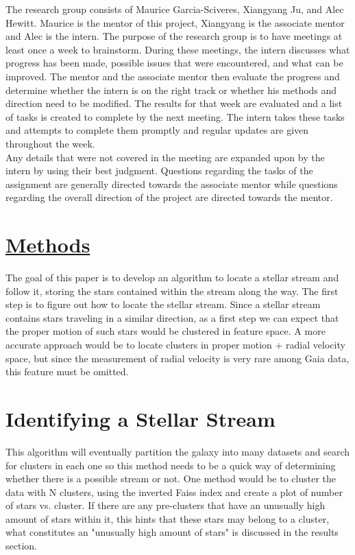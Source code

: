 \documentclass[notitlepage,nofootinbib,preprintnumbers,aps,prd]{revtex4-1}
\begin{document}
\indent The research group consists of Maurice Garcia-Sciveres, Xiangyang Ju, and Alec Hewitt.
Maurice is the mentor of this project, Xiangyang is the associate mentor and Alec is the intern.
The purpose of the research group is to have meetings at least once a week to brainstorm. During
these meetings, the intern discusses what progress has been made, possible issues that were encountered, and what can be improved. The mentor and the associate mentor then evaluate the
progress and determine whether the intern is on the right track or whether his methods and direction need to be modified. The results for that week are evaluated and a list of tasks is created to
complete by the next meeting. The intern takes these tasks and attempts to complete them
promptly and regular updates are given throughout the week.\\

\indent Any details that were not covered in the meeting are expanded upon by the intern by using their best judgment. Questions regarding the tasks of the assignment are generally directed
towards the associate mentor while questions regarding the overall direction of the project are
directed towards the mentor.\\


\section{\underline{Methods}}
\indent The goal of this paper is to develop an algorithm to locate a stellar stream and follow it, storing the stars contained within the stream along the way. The first step is to figure out how to locate the stellar stream. Since a stellar stream contains stars traveling in a similar direction, as a first step we can expect that the proper motion of such stars would be clustered in feature space. A more accurate approach would be to locate clusters in proper motion + radial velocity space, but since the measurement of radial velocity is very rare among Gaia data, this feature must be omitted. \\
\section*{Identifying a Stellar Stream}
\indent This algorithm will eventually partition the galaxy into many datasets and search for clusters in each one so this method needs to be a quick way of determining whether there is a possible stream or not. One method would be to cluster the data with N clusters, using the inverted Faiss index and create a plot of number of stars vs. cluster. If there are any pre-clusters that have an unusually high amount of stars within it, this hints that these stars may belong to a cluster, what constitutes an "unusually high amount of stars" is discussed in the results section. \\
	
\end{document}
